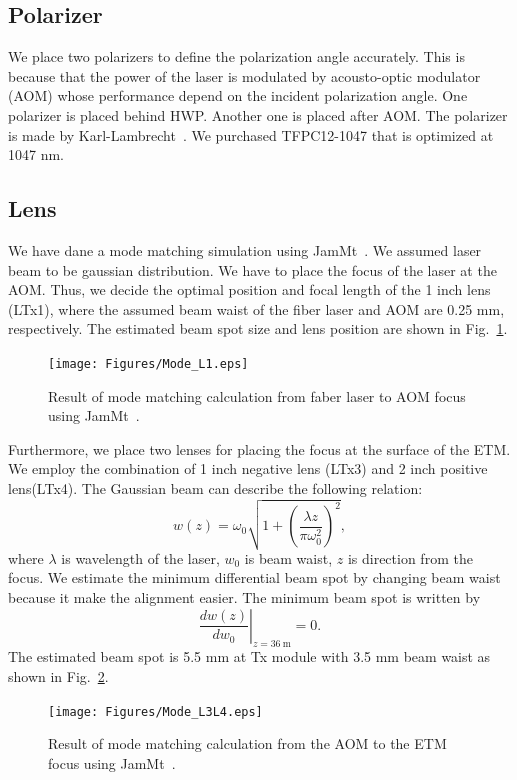 \subsection{Polarizer}
We place two polarizers to define the polarization angle accurately. This is because that the power of the laser is modulated by acousto-optic modulator (AOM) whose performance depend on the incident polarization angle.
One polarizer is placed behind HWP. Another one is placed after AOM. The polarizer is made by Karl-Lambrecht~\cite{Karl_Lambrecht}. We purchased TFPC12-1047 that is optimized at 1047 nm. 

\subsection{Lens}
We have dane a mode matching simulation using JamMt~\cite{JamMt}. We assumed laser beam to be gaussian distribution. We have to place the focus of the laser at the AOM. Thus, we decide the optimal position and focal length of the 1 inch lens (LTx1), where the assumed beam waist of the fiber laser and AOM are 0.25 mm, respectively. The estimated beam spot size and lens position are shown in Fig.~\ref{fig:Mode_L1}.
\begin{figure}
\begin{center}
\texttt{[image: Figures/Mode\_L1.eps]}
\caption{Result of mode matching calculation from faber laser to AOM focus using JamMt~\cite{JamMt}.} 
\label{fig:Mode_L1} 
\end{center}
\end{figure}

Furthermore, we place two lenses for placing the focus at the surface of the ETM. We employ the combination of 1 inch negative lens (LTx3) and 2 inch positive lens(LTx4). The Gaussian beam can describe the following relation:
\begin{equation}
w(z)=\omega_0\sqrt{1+\left( \frac{\lambda z}{\pi \omega_0^2}\right)^2},
\end{equation}
where $\lambda$ is wavelength of the laser, $w_0$ is beam waist, $z$ is direction from the focus. We estimate the minimum differential beam spot by changing beam waist because it make the alignment easier. The minimum beam spot is written by 
\begin{equation}
\left .\frac{dw(z)}{dw_0} \right|_{z=36~\mathrm{m}}=0.
\end{equation}
The estimated beam spot is 5.5 mm at Tx module with 3.5 mm beam waist as shown in Fig.~\ref{fig:Mode_L3L4}.
\begin{figure}
\begin{center}
\texttt{[image: Figures/Mode\_L3L4.eps]}
\caption{Result of mode matching calculation from the AOM to the ETM focus using JamMt~\cite{JamMt}.} 
\label{fig:Mode_L3L4} 
\end{center}
\end{figure}

